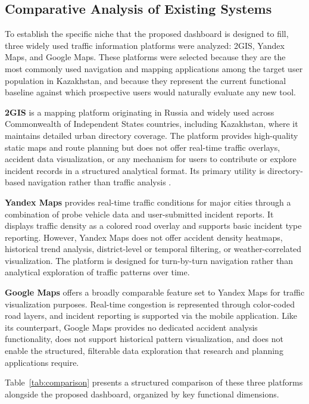 \documentclass[12pt,a4paper]{report}
\begin{document}
\subsection{Comparative Analysis of Existing Systems}

To establish the specific niche that the proposed dashboard is designed
to fill, three widely used traffic information platforms were analyzed:
2GIS, Yandex Maps, and Google Maps. These platforms were selected
because they are the most commonly used navigation and mapping
applications among the target user population in Kazakhstan, and
because they represent the current functional baseline against which
prospective users would naturally evaluate any new tool.

\textbf{2GIS} is a mapping platform originating in Russia and widely
used across Commonwealth of Independent States countries, including
Kazakhstan, where it maintains detailed urban directory coverage. The
platform provides high-quality static maps and route planning but does
not offer real-time traffic overlays, accident data visualization, or
any mechanism for users to contribute or explore incident records in a
structured analytical format. Its primary utility is directory-based
navigation rather than traffic analysis \cite{osm2024}.

\textbf{Yandex Maps} provides real-time traffic conditions for major
cities through a combination of probe vehicle data and user-submitted
incident reports. It displays traffic density as a colored road overlay
and supports basic incident type reporting. However, Yandex Maps does
not offer accident density heatmaps, historical trend analysis,
district-level or temporal filtering, or weather-correlated
visualization. The platform is designed for turn-by-turn navigation
rather than analytical exploration of traffic patterns over time.

\textbf{Google Maps} offers a broadly comparable feature set to Yandex
Maps for traffic visualization purposes. Real-time congestion is
represented through color-coded road layers, and incident reporting is
supported via the mobile application. Like its counterpart, Google Maps
provides no dedicated accident analysis functionality, does not support
historical pattern visualization, and does not enable the structured,
filterable data exploration that research and planning applications
require.

Table~\ref{tab:comparison} presents a structured comparison of these
three platforms alongside the proposed dashboard, organized by key
functional dimensions.
\end{document}

